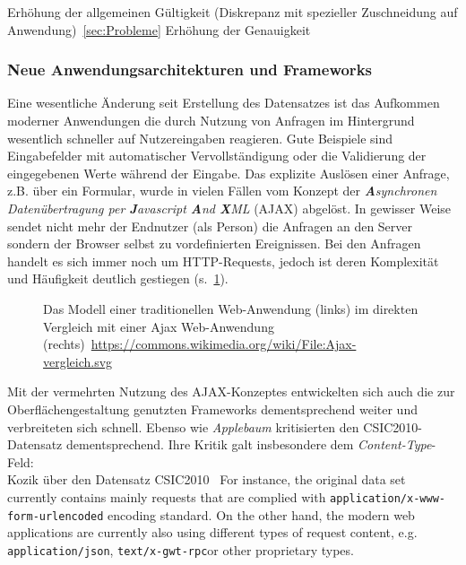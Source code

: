 \begin{neu}
Erhöhung der allgemeinen Gültigkeit (Diskrepanz mit spezieller Zuschneidung auf Anwendung)~\ref{sec:Probleme}
Erhöhung der Genauigkeit
\end{neu}

\subsubsection{Neue Anwendungsarchitekturen und Frameworks}
\label{sec:neueframeworks}
Eine wesentliche Änderung seit Erstellung des Datensatzes ist das Aufkommen moderner Anwendungen die durch Nutzung von Anfragen im Hintergrund wesentlich schneller auf Nutzereingaben reagieren. Gute Beispiele sind Eingabefelder mit automatischer Vervollständigung oder die Validierung der eingegebenen Werte während der Eingabe. Das explizite Auslösen einer Anfrage, z.B. über ein Formular, wurde in vielen Fällen vom Konzept der \emph{\textbf{A}synchronen Datenübertragung per \textbf{J}avascript \textbf{A}nd \textbf{X}ML} (AJAX) abgelöst. In gewisser Weise sendet nicht mehr der Endnutzer (als Person) die Anfragen an den Server sondern der Browser selbst zu vordefinierten Ereignissen. Bei den Anfragen handelt es sich immer noch um HTTP-Requests, jedoch ist deren Komplexität und Häufigkeit deutlich gestiegen (s.~\ref{fig:ajax}).

\begin{figure}[h]
  \centering
  
  \caption{Das Modell einer traditionellen Web-Anwendung (links) im direkten Vergleich mit einer Ajax Web-Anwendung (rechts)~\url{https://commons.wikimedia.org/wiki/File:Ajax-vergleich.svg}}
  \label{fig:ajax}
\end{figure}


Mit der vermehrten Nutzung des AJAX-Konzeptes entwickelten sich auch die zur Oberflächengestaltung genutzten Frameworks dementsprechend weiter und verbreiteten sich schnell. Ebenso wie \emph{Applebaum} kritisierten \cite{kozik2019} den CSIC2010-Datensatz dementsprechend. Ihre Kritik galt insbesondere dem \glqq\emph{Content-Type}\grqq-Feld:\\

\textcolor{bhtGray}{ Kozik über den Datensatz CSIC2010~\cite{kozik2019}} For instance, the original data set currently contains mainly requests that are complied with \glqq\verb=application/x-www-form-urlencoded=\grqq
encoding standard. On the other hand, the modern web applications are currently also using different types of request content, e.g. \glqq\verb=application/json=\grqq, \glqq\verb=text/x-gwt-rpc=\grqq or other proprietary types.\\


